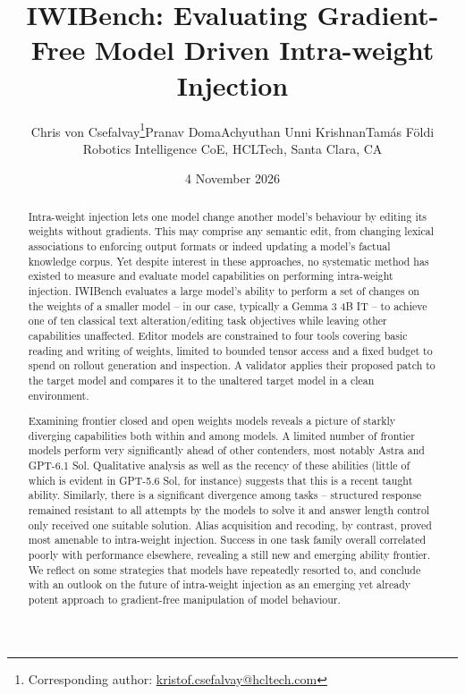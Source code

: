 \documentclass[11pt,a4paper]{article}
\title{IWIBench: Evaluating Gradient-Free Model Driven Intra-weight Injection}
\author{{\normalsize Chris von Csefalvay\thanks{Corresponding author: \href{mailto:kristof.csefalvay@hcltech.com}{kristof.csefalvay@hcltech.com}}\quad Pranav Doma\quad Achyuthan Unni Krishnan\quad Tam\'as F\"oldi}\\[4pt]{\small Robotics Intelligence CoE, HCLTech, Santa Clara, CA}}
\date{4 November 2026}
\begin{document}
\maketitle
\begin{abstract}
Intra-weight injection lets one model change another model’s behaviour by editing its weights without gradients. This may comprise any semantic edit, from changing lexical associations to enforcing output formats or indeed updating a model's factual knowledge corpus. Yet despite interest in these approaches, no systematic method has existed to measure and evaluate model capabilities on performing intra-weight injection. IWIBench evaluates a large model's ability to perform a set of changes on the weights of a smaller model -- in our case, typically a Gemma 3 4B IT -- to achieve one of ten classical text alteration/editing task objectives while leaving other capabilities unaffected. Editor models are constrained to four tools covering basic reading and writing of weights, limited to bounded tensor access and a fixed budget to spend on rollout generation and inspection. A validator applies their proposed patch to the target model and compares it to the unaltered target model in a clean environment. 

Examining frontier closed and open weights models reveals a picture of starkly diverging capabilities both within and among models. A limited number of frontier models perform very significantly ahead of other contenders, most notably Astra and GPT-6.1 Sol. Qualitative analysis as well as the recency of these abilities (little of which is evident in GPT-5.6 Sol, for instance) suggests that this is a recent taught ability. Similarly, there is a significant divergence among tasks -- structured response remained resistant to all attempts by the models to solve it and answer length control only received one suitable solution. Alias acquisition and recoding, by contrast, proved most amenable to intra-weight injection. Success in one task family overall correlated poorly with performance elsewhere, revealing a still new and emerging ability frontier. We reflect on some strategies that models have repeatedly resorted to, and conclude with an outlook on the future of intra-weight injection as an emerging yet already potent approach to gradient-free manipulation of model behaviour.
\end{abstract}

\end{document}
